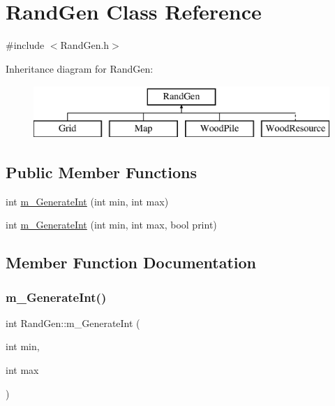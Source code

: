 \hypertarget{class_rand_gen}{}\section{Rand\+Gen Class Reference}
\label{class_rand_gen}


{\ttfamily \#include $<$Rand\+Gen.\+h$>$}

Inheritance diagram for Rand\+Gen\+:\begin{figure}[H]
\begin{center}
\leavevmode
\includegraphics[height=2.000000cm]{class_rand_gen}
\end{center}
\end{figure}
\subsection*{Public Member Functions}
\begin{DoxyCompactItemize}
\item 
int \mbox{\hyperlink{class_rand_gen_aa82bd09942b993c8900e581feca86358}{m\+\_\+\+Generate\+Int}} (int min, int max)
\item 
int \mbox{\hyperlink{class_rand_gen_a5d786a628d29d51aae40a9df78c1f928}{m\+\_\+\+Generate\+Int}} (int min, int max, bool print)
\end{DoxyCompactItemize}


\subsection{Member Function Documentation}
\mbox{\label{class_rand_gen_aa82bd09942b993c8900e581feca86358}} 
\subsubsection{\texorpdfstring{m\+\_\+\+Generate\+Int()}{m\_GenerateInt()}\hspace{0.1cm}{\footnotesize\ttfamily [1/2]}}
{\footnotesize\ttfamily int Rand\+Gen\+::m\+\_\+\+Generate\+Int (\begin{DoxyParamCaption}\item[{int}]{min,  }\item[{int}]{max }\end{DoxyParamCaption})}

